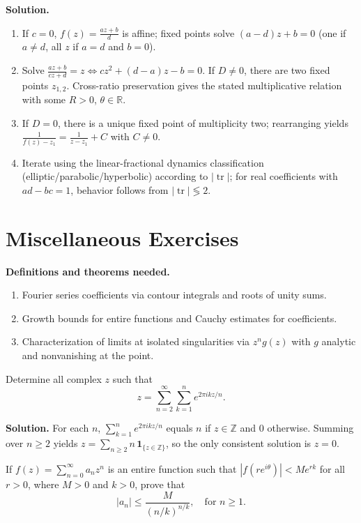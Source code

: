 \noindent\textbf{Solution.}
\begin{enumerate}[label=(\alph*)]
\item If $c=0$, $f(z)=\frac{a z+b}{d}$ is affine; fixed points solve $(a-d)z+b=0$ (one if $a\ne d$, all $z$ if $a=d$ and $b=0$).
\item Solve $\frac{a z+b}{c z+d}=z\iff c z^2+(d-a)z-b=0$. If $D\ne0$, there are two fixed points $z_{1,2}$. Cross-ratio preservation gives the stated multiplicative relation with some $R>0$, $\theta\in\mathbb R$.
\item If $D=0$, there is a unique fixed point of multiplicity two; rearranging yields $\frac{1}{f(z)-z_1}=\frac{1}{z-z_1}+C$ with $C\ne0$.
\item Iterate using the linear-fractional dynamics classification (elliptic/parabolic/hyperbolic) according to $|\operatorname{tr}|$; for real coefficients with $ad-bc=1$, behavior follows from $|\operatorname{tr}|\lessgtr2$.
\end{enumerate}

\section{Miscellaneous Exercises}

\noindent\textbf{Definitions and theorems needed.}
\begin{enumerate}[label=(\alph*)]
\item Fourier series coefficients via contour integrals and roots of unity sums.
\item Growth bounds for entire functions and Cauchy estimates for coefficients.
\item Characterization of limits at isolated singularities via $z^n g(z)$ with $g$ analytic and nonvanishing at the point.
\end{enumerate}

\begin{problembox}
Determine all complex \( z \) such that
\[ z = \sum_{n=2}^{\infty} \sum_{k=1}^{n} e^{2\pi i k z / n}. \]
\end{problembox}

\noindent\textbf{Solution.}
For each $n$, $\sum_{k=1}^n e^{2\pi i k z/n}$ equals $n$ if $z\in\mathbb Z$ and $0$ otherwise. Summing over $n\ge2$ yields $z=\sum_{n\ge2} n\,\mathbf 1_{\{z\in\mathbb Z\}}$, so the only consistent solution is $z=0$.

\begin{problembox}
If \( f(z) = \sum_{n=0}^{\infty} a_n z^n \) is an entire function such that \( |f(r e^{i\theta})| < M e^{r k} \) for all \( r > 0 \), where \( M > 0 \) and \( k > 0 \), prove that
\[ |a_n| \leq \frac{M}{(n/k)^{n/k}}, \quad \text{for } n \geq 1. \]
\end{problembox}

